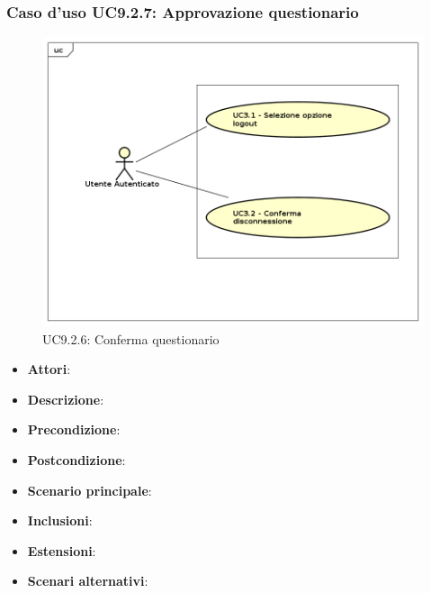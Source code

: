 		\subsubsection{Caso d'uso UC9.2.7: Approvazione questionario}
		\label{UC9.2.6}
		\begin{figure}[h]
			\centering
		\includegraphics[scale=0.7,keepaspectratio]{UML/UC9.png}
			\caption{UC9.2.6: Conferma questionario}
		\end{figure}
		\FloatBarrier
		\begin{itemize}
			\item \textbf{Attori}: 
			\item \textbf{Descrizione}: 
			\item \textbf{Precondizione}: 
			\item \textbf{Postcondizione}: 
			\item \textbf{Scenario principale}:
			\item \textbf{Inclusioni}:
			\item \textbf{Estensioni}:
			\item \textbf{Scenari alternativi}:
		\end{itemize}
	 
	
	